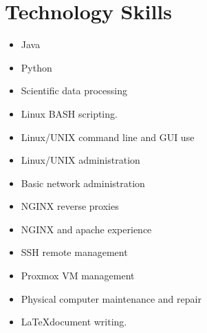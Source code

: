 \documentclass[letterpaper,10pt]{article}
\begin{document}
\section*{Technology Skills}
	\begin{multicols}{2}
	\begin{itemize}
	\item Java
	\item Python
	\item Scientific data processing
	\item Linux BASH scripting.
	\item Linux/UNIX command line and GUI use
	\item Linux/UNIX administration
	\item Basic network administration
	\item NGINX reverse proxies
	\item NGINX and apache experience
	\item SSH remote management
	\item Proxmox VM management
	\item Physical computer maintenance and repair
	\item \LaTeX document writing.
	\end{itemize}
	\end{multicols}
\end{document}
